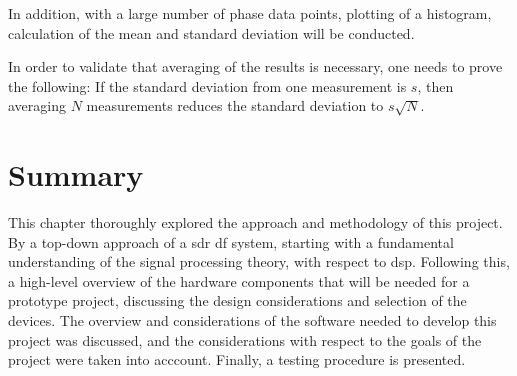 \documentclass[class=report,11pt,crop=false]{standalone}
\begin{document}
In addition, with a large number of phase data points, plotting of a histogram, calculation of the mean and standard deviation will be conducted. 

In order to validate that averaging of the results is necessary, one needs to prove the following:
If the standard deviation from one measurement is $s$, then averaging $N$ measurements reduces the standard deviation to $s \sqrt{N}$.


\section{Summary}
This chapter thoroughly explored the approach and methodology of this project. By a top-down approach of a \gls{sdr} \gls{df} system, starting with a fundamental understanding of the signal processing theory, with respect to \gls{dsp}. Following this, a high-level overview of the hardware components that will be needed for a prototype project, discussing the design considerations and selection of the devices. The overview and considerations of the software needed to develop this project was discussed, and the considerations with respect to the goals of the project were taken into acccount. Finally, a testing procedure is presented. 
\ifstandalone

\printnoidxglossary[type=\acronymtype, nonumberlist]
\fi
\end{document}
